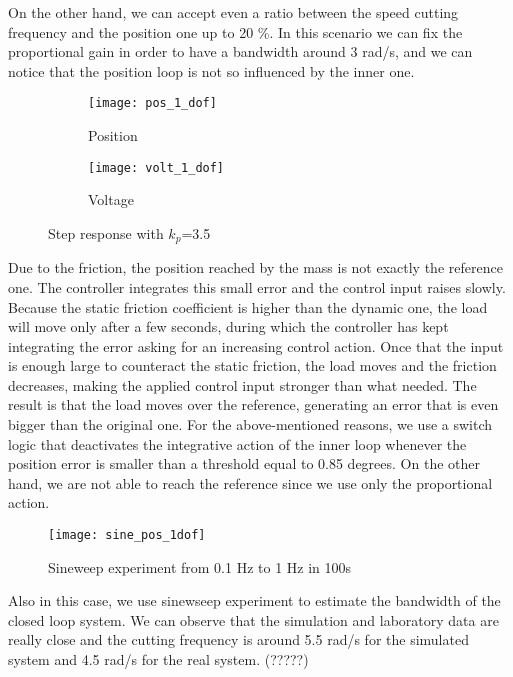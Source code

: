 On the other hand, we can accept even a ratio between the speed cutting frequency and the position one up to 20 \%. In this scenario we can fix the proportional gain in order to have a bandwidth around 3 rad/s, and we can notice that the position loop is not so influenced by the inner one.


\begin{figure*}[h]
	\centering
	\begin{subfigure}{0.45\columnwidth}
		\texttt{[image: pos\_1\_dof]}
		\caption{Position}
	\end{subfigure}
	\begin{subfigure}{0.45\columnwidth}
		\texttt{[image: volt\_1\_dof]}
		\caption{Voltage}
	\end{subfigure}
	\caption{Step response with $k_{p} $=3.5}
	\label{fig:Pos_1dof_3.5}
\end{figure*}

Due to the friction, the position reached by the mass is not exactly the reference one. The controller integrates this small error and the control input raises slowly. Because the static friction coefficient is higher than the dynamic one, the load will move only after a few seconds, during which the controller has kept integrating the error asking for an increasing control action.
Once that the input is enough large to counteract the static friction, the load moves and the friction decreases, making the applied control input stronger than what needed. The result is that the load moves over the reference, generating an error that is even bigger than the original one.
For the above-mentioned reasons, we use a switch logic that deactivates the integrative action of the inner loop whenever the position error is smaller than a threshold equal to 0.85 degrees. On the other hand, we are not able to reach the reference since we use only the proportional action.

\begin{figure*}[h]
	\centering
	\texttt{[image: sine\_pos\_1dof]}
	\caption{Sineweep experiment from 0.1 Hz to 1 Hz in 100s}
	\label{fig:sinesweep_pos_1dof}
\end{figure*}

Also in this case, we use sinewseep experiment to estimate the bandwidth of the closed loop system. We can observe that the simulation and laboratory data are really close and the cutting frequency is around 5.5 rad/s for the simulated system and 4.5 rad/s for the real system. (?????)

\newpage

